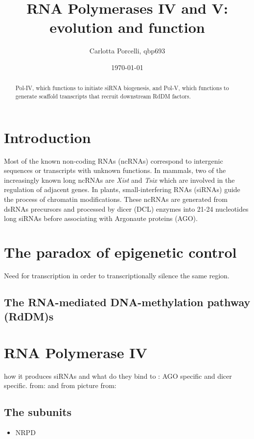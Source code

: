 \documentclass[a4paper, twocolumn]{article}
\title{RNA Polymerases IV and V: evolution and function}
\author{Carlotta Porcelli, qbp693}
\date{\today}
\begin{document}
\maketitle

\begin{abstract}
	
Pol-IV, which functions to initiate siRNA biogenesis, and Pol-V, which functions to generate scaffold transcripts that recruit downstream RdDM factors. 

\end{abstract}

\section{Introduction}
Most of the known non-coding RNAs (ncRNAs) correspond to intergenic sequences or transcripts with unknown functions. In mammals, two of the increasingly known long ncRNAs are \textit{Xist} and \textit{Tsix} which are involved in the regulation of adjacent genes. 
In plants, small-interfering RNAs (siRNAs) guide the process of chromatin modifications. These ncRNAs are generated from dsRNAs precursors and processed by dicer (DCL) enzymes into 21-24 nucleotides long siRNAs before associating with Argonaute proteins (AGO). 

\section{The paradox of epigenetic control}
Need for transcription in order to transcriptionally silence the same region. \cite{paradox}

\subsection{The RNA-mediated DNA-methylation pathway (RdDM)s}


\section{RNA Polymerase IV}
how it produces siRNAs and what do they bind to : AGO specific and dicer specific. 
from:  \cite{Zhang130} and from \cite{ONODERA2005}
picture from: \cite{Xu2013}

\subsection{The subunits}

\begin{itemize}
	\item NRPD

\end{itemize}
\end{document}
